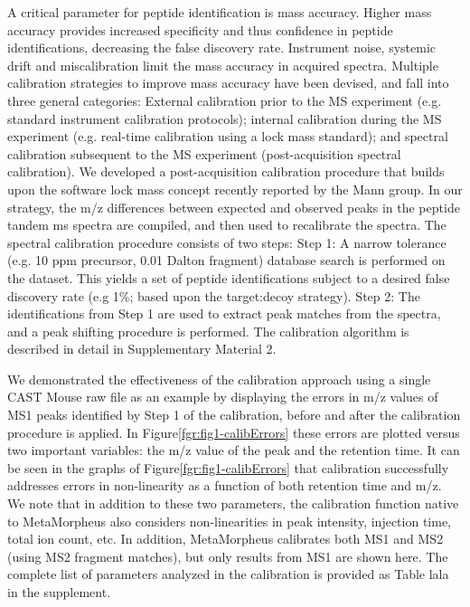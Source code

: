\documentclass[journal=jprobs,manuscript=article]{achemso}
\begin{document}
A critical parameter for peptide identification is mass accuracy\citep{Scherl_2008}.
Higher mass accuracy provides increased specificity and thus confidence in peptide identifications, decreasing the false discovery rate.
Instrument noise, systemic drift and miscalibration limit the mass accuracy in acquired spectra.
Multiple calibration strategies to improve mass accuracy have been devised, and fall into three general categories: External calibration prior to the MS experiment (e.g. standard instrument calibration protocols); internal calibration during the MS experiment (e.g. real-time calibration using a lock mass standard\citep{Olsen_2005}); and spectral calibration subsequent to the MS experiment (post-acquisition spectral calibration).
We developed a post-acquisition calibration procedure that builds upon the software lock mass concept\citep{Cox_2011} recently reported by the Mann group.
In our strategy, the m/z differences between expected and observed peaks in the peptide tandem ms spectra are compiled, and then used to recalibrate the spectra.
The spectral calibration procedure consists of two steps: Step 1: A narrow tolerance (e.g. 10 ppm precursor, 0.01 Dalton fragment) database search is performed on the dataset.
This yields a set of peptide identifications subject to a desired false discovery rate (e.g 1\%; based upon the target:decoy strategy\citep{Elias_2007}).
Step 2: The identifications from Step 1 are used to extract peak matches from the spectra, and a peak shifting procedure is performed.
The calibration algorithm is described in detail in Supplementary Material 2.

We demonstrated the effectiveness of the calibration approach using a single CAST Mouse raw file as an example by displaying the errors in m/z values of MS1 peaks identified by Step 1 of the calibration, before and after the calibration procedure is applied.
In Figure\ref{fgr:fig1-calibErrors} these errors are plotted versus two important variables: the m/z value of the peak and the retention time.
It can be seen in the graphs of Figure\ref{fgr:fig1-calibErrors} that calibration successfully addresses errors in non-linearity as a function of both retention time and m/z.
We note that in addition to these two parameters, the calibration function native to MetaMorpheus also considers non-linearities in peak intensity, injection time, total ion count, etc.
In addition, MetaMorpheus calibrates both MS1 and MS2 (using MS2 fragment matches), but only results from MS1 are shown here.
The complete list of parameters analyzed in the calibration is provided as Table lala in the supplement. 
\end{document}
